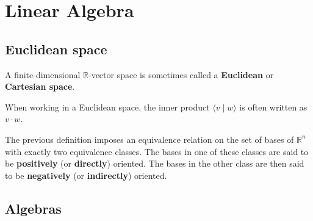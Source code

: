 \chapter{Linear Algebra}\label{chapter:linear_algebra}






\section{Euclidean space}

    A finite-dimensional $\mathbb{R}$-vector space is sometimes called a \textbf{Euclidean} or \textbf{Cartesian space}.

    \begin{notation}
        When working in a Euclidean space, the inner product $\langle v\mid w \rangle$ is often written as $v\cdot w$.
    \end{notation}

    \begin{result}
        The previous definition imposes an equivalence relation on the set of bases of $\mathbb{R}^n$ with exactly two equivalence classes. The bases in one of these classes are said to be \textbf{positively} (or \textbf{directly}) oriented. The bases in the other class are then said to be \textbf{negatively} (or \textbf{indirectly}) oriented.
    \end{result}

\section{Algebras}

